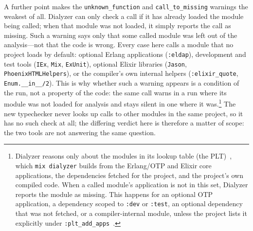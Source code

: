 A further point makes the \texttt{unknown\_function} and \texttt{call\_to\_missing} warnings the weakest of all.
Dialyzer can only check a call if it has already loaded the module being called; when that module was not loaded, it simply reports the call as missing.
Such a warning says only that some called module was left out of the analysis---not that the code is wrong.
Every case here calls a module that no project loads by default: optional Erlang applications (\texttt{:eldap}), development and test tools (\texttt{IEx}, \texttt{Mix}, \texttt{ExUnit}), optional Elixir libraries (\texttt{Jason}, \texttt{PhoenixHTMLHelpers}), or the compiler's own internal helpers (\texttt{:elixir\_quote}, \texttt{Enum.\_\_in\_\_/2}).
This is why whether such a warning appears is a condition of the run, not a property of the code: the same call warns in a run where its module was not loaded for analysis and stays silent in one where it was.\footnote{Dialyzer reasons only about the modules in its lookup table (the PLT)~\cite{dialyzer-manual}, which \texttt{mix dialyzer} builds from the Erlang/OTP and Elixir core applications, the dependencies fetched for the project, and the project's own compiled code. When a called module's application is not in this set, Dialyzer reports the module as missing. This happens for an optional OTP application, a dependency scoped to \texttt{:dev} or \texttt{:test}, an optional dependency that was not fetched, or a compiler-internal module, unless the project lists it explicitly under \texttt{:plt\_add\_apps}~\cite{dialyxir}.}
The new typechecker never looks up calls to other modules in the same project, so it has no such check at all; the differing verdict here is therefore a matter of scope: the two tools are not answering the same question.

